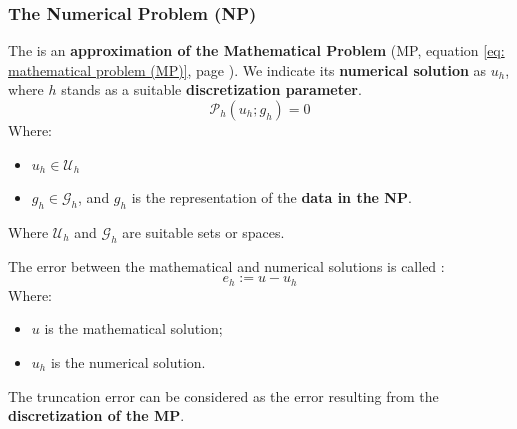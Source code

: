 \subsubsection{The Numerical Problem (NP)}

The  is an \textbf{approximation of the Mathematical Problem} (MP, equation \ref{eq: mathematical problem (MP)}, page \pageref{eq: mathematical problem (MP)}). We indicate its \textbf{numerical solution} as $u_{h}$, where $h$ stands as a suitable \textbf{discretization parameter}.
\begin{equation}\label{eq: numerical problem (NP)}
    \mathcal{P}_{h}\left(u_{h}; g_{h}\right) = 0
\end{equation}
Where:
\begin{itemize}
    \item $u_{h} \in \mathcal{U}_{h}$
    \item $g_{h} \in \mathcal{G}_{h}$, and $g_{h}$ is the representation of the \textbf{data in the NP}.
\end{itemize}
Where $\mathcal{U}_{h}$ and $\mathcal{G}_{h}$ are suitable sets or spaces.

\highspace
\begin{definitionbox}
    The error between the mathematical and numerical solutions is called :
    \begin{equation}\label{eq: Truncation Error}
        e_{h} := u - u_{h}
    \end{equation}
    Where:
    \begin{itemize}
        \item $u$ is the mathematical solution;
        \item $u_{h}$ is the numerical solution.
    \end{itemize}
\end{definitionbox}

\noindent
The truncation error can be considered as the error resulting from the \textbf{discretization of the MP}.

